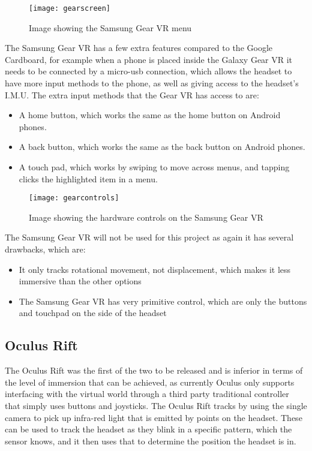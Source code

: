 \begin{figure}[h]
	\texttt{[image: gearscreen]}
	\centering
	\caption{Image showing the Samsung Gear VR menu \cite{gearmenu}}
	\label{fig:gearscreen}
\end{figure}

The Samsung Gear VR has a few extra features compared to the Google Cardboard, for example when a phone is placed inside the Galaxy Gear VR it needs to be connected by a micro-usb connection, which allows the headset to have more input methods to the phone, as well as giving access to the headset's I.M.U. The extra input methods that the Gear VR has access to are:\\

\begin{itemize}
	\item A home button, which works the same as the home button on Android phones.
	\item A back button, which works the same as the back button on Android phones.
	\item A touch pad, which works by swiping to move across menus, and tapping clicks the highlighted item in a menu.
\end{itemize}

\begin{figure}[h]
	\texttt{[image: gearcontrols]}
	\centering
	\caption{Image showing the hardware controls on the Samsung Gear VR \cite{gearbuttons}}
	\label{fig:gearcontrols}
\end{figure}

The Samsung Gear VR will not be used for this project as again it has several drawbacks, which are:

\begin{itemize}
	\item It only tracks rotational movement, not displacement, which makes it less immersive than the other options
	\item The Samsung Gear VR has very primitive control, which are only the buttons and touchpad on the side of the headset
\end{itemize}		

\subsection{Oculus Rift}
The Oculus Rift was the first of the two to be released and is inferior in terms of the level of immersion that can be achieved, as currently Oculus only supports interfacing with the virtual world through a third party traditional controller that simply uses buttons and joysticks. The Oculus Rift tracks by using the single camera to pick up infra-red light that is emitted by points on the headset. These can be used to track the headset as they blink in a specific pattern, which the sensor knows, and it then uses that to determine the position the headset is in.

